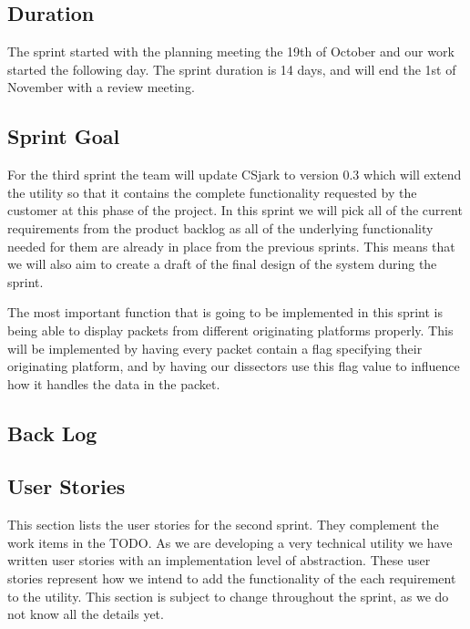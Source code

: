\subsection{Duration}

The sprint started with the planning meeting the 19th of October and our work started the following day. The sprint duration is 14 days, and will end the 1st of November with a review meeting. 


\subsection{Sprint Goal}
For the third sprint the team will update CSjark to version 0.3 which will extend the utility so that it contains the complete functionality requested by the customer at this phase of the project. In this sprint we will pick all of the current requirements from the product backlog as all of the underlying functionality needed for them are already in place from the previous sprints. This means that we will also aim to create a draft of the final design of the system during the sprint.

The most important function that is going to be implemented in this sprint is being able to display packets from different originating platforms properly. This will be implemented by having every packet contain a flag specifying their originating platform, and by having our dissectors use this flag value to influence how it handles the data in the packet.

\subsection{Back Log}

\subsection{User Stories}

This section lists the user stories for the second sprint. They complement
the work items in the TODO. As we are developing a very technical utility we
have written user stories with an implementation level of abstraction. These
user stories represent how we intend to add the functionality of the each
requirement to the utility. This section is subject to change throughout the
sprint, as we do not know all the details yet.\\

